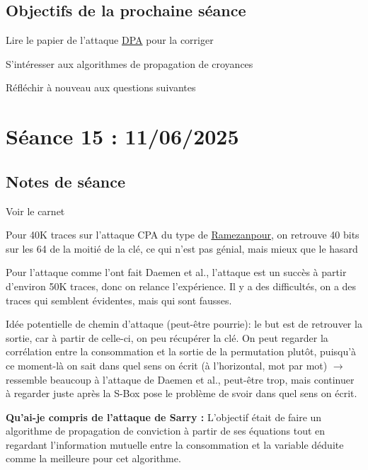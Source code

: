 \documentclass[12pt]{article}
\newcommand{\cmark}{\ding{51}}%
\newcommand{\done}{\rlap{$\square$}{\raisebox{2pt}{\large\hspace{1pt}\cmark}}%
	\hspace{-2.5pt}}
\begin{document}
	\subsection{Objectifs de la prochaine séance}
	\begin{todolist}
		\item[\done] Lire le papier de l'attaque \href{https://dl.acm.org/doi/pdf/10.1145/3075564.3079067}{DPA} pour la corriger
		\item[\done] S'intéresser aux algorithmes de propagation de croyances
		\item[\done] Réfléchir à nouveau aux questions suivantes
	\end{todolist}
	
	
	\section{Séance 15 : 11/06/2025}
	\subsection{Notes de séance}
	Voir le carnet
	
	\noindent Pour 40K traces sur l'attaque CPA du type de \href{https://csrc.nist.gov/CSRC/media/Events/lightweight-cryptography-workshop-2020/documents/papers/active-passive-recovery-attacks-ascon-lwc2020.pdf}{Ramezanpour}, on retrouve 40 bits sur les 64 de la moitié de la clé, ce qui n'est pas génial, mais mieux que le hasard
	
	\noindent Pour l'attaque comme l'ont fait Daemen et al., l'attaque est un succès à partir d'environ 50K traces, donc on relance l'expérience. Il y a des difficultés, on a des traces qui semblent évidentes, mais qui sont fausses.
	
	\noindent Idée potentielle de chemin d'attaque (peut-être pourrie): le but est de retrouver la sortie, car à partir de celle-ci, on peu récupérer la clé. On peut regarder la corrélation entre la consommation et la sortie de la permutation plutôt, puisqu'à ce moment-là on sait dans quel sens on écrit (à l'horizontal, mot par mot) $\rightarrow$ ressemble beaucoup à l'attaque de Daemen et al., peut-être trop, mais continuer à regarder juste après la S-Box pose le problème de svoir dans quel sens on écrit.
	
	\noindent \textbf{Qu'ai-je compris de l'attaque de Sarry :} L'objectif était de faire un algorithme de propagation de conviction à partir de ses équations tout en regardant l'information mutuelle entre la consommation et la variable déduite comme la meilleure pour cet algorithme.
	
\end{document}
